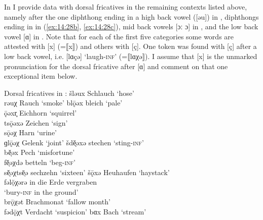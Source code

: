 In  I provide data with dorsal fricatives in the remaining contexts listed above, namely after the one diphthong ending in a high back vowel ([əu]) in , diphthongs ending in  in (\ref{ex:14:28b}, \ref{ex:14:28c}), mid back vowels [ɔː ɔ] in , and the low back vowel [ɑ] in . Note that for each of the first five categories some words are attested with [x] (=⟦x⟧) and others with [ç]. One token was found with [ç] after a low back vowel, i.e. [lɑçə] ‘laugh\textsc{{}-inf}’ (=⟦lɑχə⟧). I assume that [x] is the unmarked pronunciation for the dorsal fricative after [ɑ] and comment on that one exceptional item below.\largerpage

\ea%
\label{ex:14:28}Dorsal fricatives in :
\ea\label{ex:14:28a} šləux \tab [ʃləux] \tab Schlauch \tab ‘hose’ \\
    rəuχ \tab [rəuç] \tab Rauch \tab ‘smoke’ 
\ex\label{ex:14:28b} blǭəx \tab [blɔːəx] \tab bleich \tab ‘pale’ \\
    ǭəxr̥ \tab [ɔːəxr̩] \tab Eichhorn \tab ‘squirrel’ \\
    tsǭəxə \tab [tsɔːəxə] \tab Zeichen \tab ‘sign’ \\
    sǭəχ \tab [sɔːəç] \tab Harn \tab ‘urine’ \\
    ɡlǭəχ \tab [glɔːəç] \tab Gelenk \tab ‘joint’ 
\ex\label{ex:14:28c} šdĕͅəxə \tab [ʃdɛəxə] \tab stechen \tab ‘sting\textsc{{}-inf}’ \\
    bĕͅəx \tab [bɛəx] \tab Pech \tab ‘misfortune’ \\
    fĕͅəχdə \tab [fɛəçdə] \tab betteln \tab ‘beg\textsc{{}-inf}’ \\
    sĕͅəχtsē̜ə \tab [sɛəçtsɛːə] \tab sechzehn \tab ‘sixteen’ 
\ex\label{ex:14:28d} šǭxə \tab [ʃɔːxə] \tab Heuhaufen \tab ‘haystack’ \\
    fəlọ̆χərə \tab [fəlɔçərə] \tab in die Erde vergraben \\
    \tab \tab ‘bury\textsc{{}-inf} in the ground’ \\
    brǭχət \tab [brɔːçət] \tab Brachmonat \tab ‘fallow month’ \\
    fədǭχt \tab [fədɔːçt] \tab Verdacht \tab ‘suspicion’ 
\ex\label{ex:14:28e} bɑx \tab [bɑx] \tab Bach \tab ‘stream’ 
\z 
\z 

